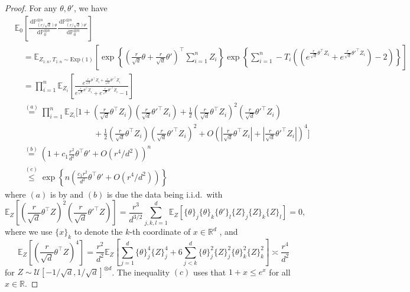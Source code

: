 \documentclass[11pt]{article}
\newcommand{\dint}{\,\mathrm{d}}
\begin{document}
\begin{proof}
For any $\theta, \theta'$, we have  
\begin{align*}
&\mathbb{E}_0 \left[ \frac{\dint\mathbb{P}_{(r/\sqrt{d})\theta}^{\otimes n}}{\dint\mathbb{P}_0^{\otimes n}}\frac{\dint\mathbb{P}_{(r/\sqrt{d})\theta'}^{\otimes n}}{\dint\mathbb{P}_0^{\otimes n}} \right] \\
&\quad=\mathbb{E}_{Z_{1:n}, T_{1:n} \sim \mathrm{Exp}(1)} \left[ \exp \left\{\left(\frac{r}{\sqrt{d}} \theta + \frac{r}{\sqrt{d}} \theta'\right)^\top \sum_{i=1}^n Z_i \right\} \exp \left\{ \sum_{i=1}^n -T_i \left(( e^{\frac{r}{\sqrt{d}} \theta^\top Z_i} + e^{\frac{r}{\sqrt{d}} \theta'^\top Z_i}) - 2 \right) \right\} 
\right] \\
&\quad= \prod_{i=1}^n \mathbb{E}_{Z_i} \left[\frac{ e^{\frac{r}{\sqrt{d}} \theta^\top Z_i + \frac{r}{\sqrt{d}} \theta'^\top Z_i}}{e^{\frac{r}{\sqrt{d}} \theta^\top Z_i} + e^{\frac{r}{\sqrt{d}} \theta'^\top Z_i} - 1} \right]\\
&\quad\stackrel{(a)}{=} \prod_{i=1}^n \mathbb{E}_{Z_i} \Bigg[ 1 + \left(\frac{r}{\sqrt{d}} \theta^\top Z_i\right)\left( \frac{r}{\sqrt{d}} \theta'^\top Z_i\right) + \frac{1}{2}\left(\frac{r}{\sqrt{d}} \theta^\top Z_i\right)^2\left(\frac{r}{\sqrt{d}} \theta'^\top Z_i\right)\\
& \hspace{4cm} +  \frac{1}{2} \left(\frac{r}{\sqrt{d}} \theta^\top Z_i \right) \left( \frac{r}{\sqrt{d}} \theta'^\top Z_i \right)^2 + O \left( \left|\frac{r}{\sqrt{d}} \theta^\top Z_i \right| + \left|\frac{r}{\sqrt{d}} \theta'^\top Z_i \right| \right)^4 \Bigg] \\
&\quad \stackrel{(b)}{=} \left(1 + c_1\frac{r^2}{d^2} \theta ^\top \theta' + O(r^4/d^2) \right)^n \\
&\quad \stackrel{(c)}{\leq} \exp \left\{ n \left(\frac{c_1r^2}{d^2} \theta ^\top \theta' + O(r^4/d^2) \right) \right\}
\end{align*}
where $(a)$ is by  and $(b)$ is due the data being i.i.d.~with
\begin{equation*}
    \mathbb{E}_Z\left[\left(\frac{r}{\sqrt{d}} \theta^\top Z \right)^2 \left(\frac{r}{\sqrt{d}} \theta'^\top Z \right) \right] = \frac{r^3}{d^{3/2}} \sum_{j, k, l=1}^ d\mathbb{E}_Z\left[\{ \theta\}_j \{ \theta\}_k \{\theta'\}_l \{Z\}_j\{Z\}_k\{Z\}_l \right] = 0,
\end{equation*}
where we use $\{x\}_k$ to denote the $k$-th coordinate of $x \in \mathbb{R}^d$ , and 
\begin{equation*}
    \mathbb{E}_Z\left[ \left(\frac{r}{\sqrt{d}} \theta^\top Z \right)^4 \right] = \frac{r^2}{d^2} \mathbb{E}_Z\left[\sum_{j=1}^d \{\theta\}_j^4 \{Z\}_j^4 +  6\sum_{j<k}^d \{\theta\}_j^2 \{Z\}_j^2 \{ \theta\}_k^2\{Z\}_k^2 \right] \asymp \frac{r^4}{d^2}
\end{equation*}
for $Z \sim \mathcal{U}[-1/\sqrt{d}, 1/\sqrt{d}]^{\otimes d}$. The inequality $(c)$ uses that $1+x \leq e^x$ for all $x \in \mathbb{R}$.  


\end{proof}
\end{document}
